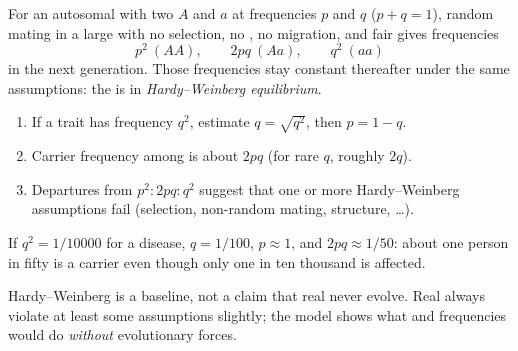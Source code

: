 \begin{definition}\label{def:g11:evolution-mechanisms:hw}
For an autosomal  with two  $A$ and $a$ at frequencies $p$ and $q$
($p + q = 1$), random mating in a large  with no selection, no
, no migration, and fair  gives  frequencies
\[
p^{2}\ (AA),\qquad 2pq\ (Aa),\qquad q^{2}\ (aa)
\]
in the next generation. Those frequencies stay constant thereafter under the
same assumptions: the  is in
\emph{Hardy--Weinberg equilibrium}.
\end{definition}

\begin{method}\label{met:g11:evolution-mechanisms:hw}
\begin{enumerate}
  \item If a  trait has  frequency $q^{2}$, estimate
        $q = \sqrt{q^{2}}$, then $p = 1 - q$.
  \item Carrier frequency among  is about $2pq$ (for rare $q$, roughly
        $2q$).
  \item Departures from $p^{2}:2pq:q^{2}$ suggest that one or more Hardy--Weinberg
        assumptions fail (selection, non-random mating, structure, \ldots).
\end{enumerate}
\end{method}

\begin{example}\label{ex:g11:evolution-mechanisms:carrier}
If $q^{2} = 1/10000$ for a  disease, $q = 1/100$, $p \approx 1$, and
$2pq \approx 1/50$: about one person in fifty is a  carrier even
though only one in ten thousand is affected.
\end{example}

\begin{remark}
Hardy--Weinberg is a baseline, not a claim that real  never evolve.
Real  always violate at least some assumptions slightly; the model
shows what  and  frequencies would do \emph{without} evolutionary
forces.
\end{remark}

